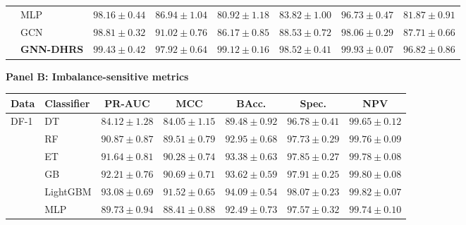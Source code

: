 \documentclass[pdflatex,sn-mathphys-num]{sn-jnl}%
\theoremstyle{thmstyleone}%
\theoremstyle{thmstyletwo}%
\theoremstyle{thmstylethree}%
\begin{document}
\begin{table}[!ht]
{\begin{tabular}{@{}llcccccc@{}}
& MLP
& $98.16\pm0.44$
& $86.94\pm1.04$
& $80.92\pm1.18$
& $83.82\pm1.00$
& $96.73\pm0.47$
& $81.87\pm0.91$ \\

& GCN
& $98.81\pm0.32$
& $91.02\pm0.76$
& $86.17\pm0.85$
& $88.53\pm0.72$
& $98.06\pm0.29$
& $87.71\pm0.66$ \\

& \textbf{GNN-DHRS}
& \textbf{$99.43\pm0.42$}
& \textbf{$97.92\pm0.64$}
& \textbf{$99.12\pm0.16$}
& \textbf{$98.52\pm0.41$}
& \textbf{$99.93\pm0.07$}
& \textbf{$96.82\pm0.86$} \\

\bottomrule
\end{tabular}%
}

\vspace{4pt}

\begingroup
 

\textbf{Panel B: Imbalance-sensitive metrics}

\vspace{2pt}

\begin{tabular}{@{}llccccc@{}}
\toprule
\textbf{Data} &
\textbf{Classifier} &
\textbf{PR-AUC} &
\textbf{MCC} &
\textbf{BAcc.} &
\textbf{Spec.} &
\textbf{NPV} \\
\midrule

\multirow{8}{*}{DF-1}
& DT
& $84.12\pm1.28$
& $84.05\pm1.15$
& $89.48\pm0.92$
& $96.78\pm0.41$
& $99.65\pm0.12$ \\

& RF
& $90.87\pm0.87$
& $89.51\pm0.79$
& $92.95\pm0.68$
& $97.73\pm0.29$
& $99.76\pm0.09$ \\

& ET
& $91.64\pm0.81$
& $90.28\pm0.74$
& $93.38\pm0.63$
& $97.85\pm0.27$
& $99.78\pm0.08$ \\

& GB
& $92.21\pm0.76$
& $90.69\pm0.71$
& $93.62\pm0.59$
& $97.91\pm0.25$
& $99.80\pm0.08$ \\

& LightGBM
& $93.08\pm0.69$
& $91.52\pm0.65$
& $94.09\pm0.54$
& $98.07\pm0.23$
& $99.82\pm0.07$ \\

& MLP
& $89.73\pm0.94$
& $88.41\pm0.88$
& $92.49\pm0.73$
& $97.57\pm0.32$
& $99.74\pm0.10$ \\


\end{tabular}
\end{table}
\end{document}
